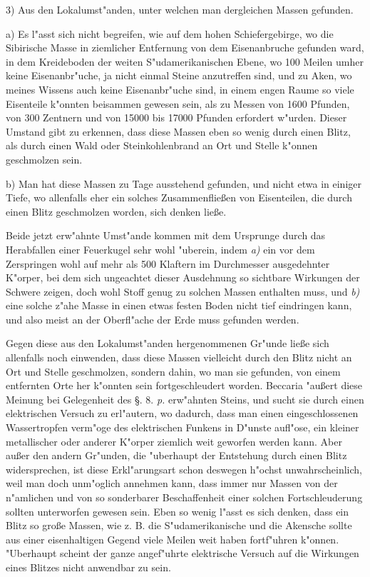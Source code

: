 \documentclass[a4paper, 11pt, oneside, polutonikogreek, german]{article}
\begin{document}
3) Aus den Lokalumst"anden, unter welchen man dergleichen Massen gefunden.

a) Es l"asst sich nicht begreifen, wie auf dem hohen Schiefergebirge, wo die Sibirische Masse in ziemlicher Entfernung von dem Eisenanbruche gefunden ward, in dem Kreideboden der weiten S"udamerikanischen Ebene, wo 100 Meilen umher keine Eisenanbr"uche, ja nicht einmal Steine anzutreffen sind, und zu Aken, wo meines Wissens auch keine Eisenanbr"uche sind, in einem engen Raume so viele Eisenteile k"onnten beisammen gewesen sein, als zu Messen von 1600 Pfunden, von 300 Zentnern und von 15000 bis 17000 Pfunden erfordert w"urden. Dieser Umstand gibt zu erkennen, dass diese Massen eben so wenig durch einen Blitz, als durch einen Wald oder Steinkohlenbrand an Ort und Stelle k"onnen geschmolzen sein.

b) Man hat diese Massen zu Tage ausstehend gefunden, und nicht etwa in einiger Tiefe, wo allenfalls eher ein solches Zusammenfließen von Eisenteilen, die durch einen Blitz geschmolzen worden, sich denken ließe.

Beide jetzt erw"ahnte Umst"ande kommen mit dem Ursprunge durch das Herabfallen einer Feuerkugel sehr wohl "uberein, indem \emph{a)} ein vor dem Zerspringen wohl auf mehr als 500 Klaftern im Durchmesser ausgedehnter K"orper, bei dem sich ungeachtet dieser Ausdehnung so sichtbare Wirkungen der Schwere zeigen, doch wohl Stoff genug zu solchen Massen enthalten muss, und \emph{b)} eine solche z"ahe Masse in einen etwas festen Boden nicht tief eindringen kann, und also meist an der Oberfl"ache der Erde muss gefunden werden.

Gegen diese aus den Lokalumst"anden hergenommenen Gr"unde ließe sich allenfalls noch einwenden, dass diese Massen vielleicht durch den Blitz nicht an Ort und Stelle geschmolzen, sondern dahin, wo man sie gefunden, von einem entfernten Orte her k"onnten sein fortgeschleudert worden. Beccaria "außert diese Meinung bei Gelegenheit des §. 8. \emph{p.} erw"ahnten Steins, und sucht sie durch einen elektrischen Versuch zu erl"autern, wo dadurch, dass man einen eingeschlossenen Wassertropfen verm"oge des elektrischen Funkens in D"unste aufl"ose, ein kleiner metallischer oder anderer K"orper ziemlich weit geworfen werden kann. Aber außer den andern Gr"unden, die "uberhaupt der Entstehung durch einen Blitz widersprechen, ist diese Erkl"arungsart schon deswegen h"ochst unwahrscheinlich, weil man doch unm"oglich annehmen kann, dass immer nur Massen von der n"amlichen und von so sonderbarer Beschaffenheit einer solchen Fortschleuderung sollten unterworfen gewesen sein. Eben so wenig l"asst es sich denken, dass ein Blitz so große Massen, wie z. B. die S"udamerikanische und die Akensche sollte aus einer eisenhaltigen Gegend viele Meilen weit haben fortf"uhren k"onnen. "Uberhaupt scheint der ganze angef"uhrte elektrische Versuch auf die Wirkungen eines Blitzes nicht anwendbar zu sein.
\clearpage
\end{document}
